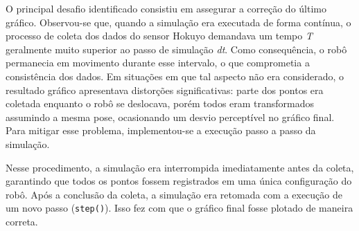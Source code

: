 \documentclass[12pt,a4paper]{article}
\begin{document}
O principal desafio identificado consistiu em assegurar a correção do último gráfico. Observou-se que, quando a simulação era executada de forma contínua, o processo de coleta dos dados do sensor Hokuyo demandava um tempo \textit{T} geralmente muito superior ao passo de simulação \textit{dt}. Como consequência, o robô permanecia em movimento durante esse intervalo, o que comprometia a consistência dos dados. Em situações em que tal aspecto não era considerado, o resultado gráfico apresentava distorções significativas: parte dos pontos era coletada enquanto o robô se deslocava, porém todos eram transformados assumindo a mesma pose, ocasionando um desvio perceptível no gráfico final. Para mitigar esse problema, implementou-se a execução passo a passo da simulação. 

Nesse procedimento, a simulação era interrompida imediatamente antes da coleta, garantindo que todos os pontos fossem registrados em uma única configuração do robô. Após a conclusão da coleta, a simulação era retomada com a execução de um novo passo (\texttt{step()}). Isso fez com que o gráfico final fosse plotado de maneira correta.
\end{document}
